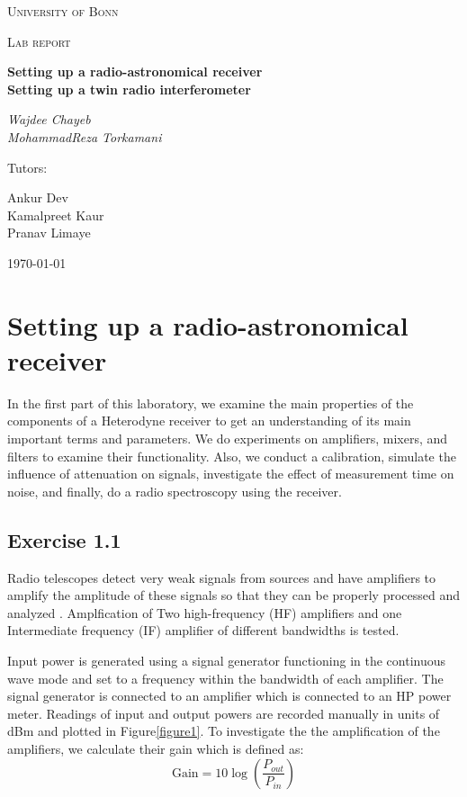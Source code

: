 \documentclass[12pt]{article}
\begin{document}
\begin{titlepage}
	\centering
	{\textsc{University of Bonn} \par}
	\vspace{1cm}
	{\Large \textsc{Lab report}\par}
	\vspace{1.5cm}
	{\huge\bfseries Setting up a radio-astronomical receiver \\
	 Setting up a twin radio interferometer\par}
	\vspace{2cm}
	{\Large\itshape Wajdee Chayeb \\
	MohammadReza Torkamani\par}
	\vfill
	Tutors:\par
	Ankur Dev\\
	Kamalpreet Kaur\\
	Pranav Limaye

	\vfill

	{\large \today\par}
\end{titlepage}

\section{Setting up a radio-astronomical receiver}\label{S1}

In the first part of this laboratory, we examine the main properties of the components of a Heterodyne receiver to get an understanding of its main important terms and parameters. We do experiments on amplifiers, mixers, and filters to examine their functionality. Also, we conduct a calibration, simulate the influence of attenuation on signals, investigate the effect of measurement time on noise, and finally, do a radio spectroscopy using the receiver. 

\subsection{Exercise 1.1}
Radio telescopes detect very weak signals from sources and have amplifiers to amplify the amplitude of these signals so that they can be properly processed and analyzed \cite{klein}. Amplfication of Two high-frequency (HF) amplifiers and one Intermediate frequency (IF) amplifier of different bandwidths is tested. 

Input power is generated using a signal generator functioning in the continuous wave mode and set to a frequency within the bandwidth of each amplifier. The signal generator is connected to an amplifier which is connected to an HP power meter. Readings of input and output powers are recorded manually in units of dBm and plotted in Figure\ref{figure1}. To investigate the the amplification of the amplifiers, we calculate their gain which is defined as:
\begin{equation}
 \text{Gain} = 10 \log (\frac{P_{out}}{P_{in}})
\end{equation}
\end{document}
